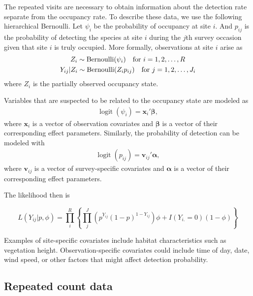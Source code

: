 \documentclass[article,shortnames]{jss}
\DeclareMathOperator{\logit}{logit}
\DeclareMathOperator{\Bern}{Bernoulli}
\begin{document}
The repeated visits are necessary to obtain information about the
detection rate separate from the occupancy rate.  To describe these
data, we use the following hierarchical Bernoulli.  Let $\psi_i$ be
the probability of occupancy at site $i$.  And $p_{ij}$ is the
probability of detecting the species at site $i$ during the $j$th
survey occasion given that site $i$ is truly occupied.  More formally,
observations at site $i$ arise as
\begin{gather}
Z_i \sim \Bern(\psi_i) \text{\quad for $i=1,2,\dots,R$} \\
Y_{ij}|Z_i \sim \Bern(Z_i p_{ij})\text{\quad for $j=1,2,\dots,J_{i}$}
\end{gather}
where $Z_i$ is the partially observed occupancy state.

Variables that are suspected to be related to the occupancy state are 
modeled as
\begin{gather}
  \logit(\psi_i) = \mathbf x_i' \mathbf \beta,
\end{gather}
where $\mathbf x_i$ is a vector of observation covariates and $\mathbf \beta$
is a vector of their corresponding effect parameters.  Similarly, the
probability of detection can be modeled with
\begin{gather}
  \logit(p_{ij}) = \mathbf v_{ij}' \mathbf \alpha,
\end{gather}
where $\mathbf v_{ij}$ is a vector of survey-specific covariates and
$\mathbf \alpha$ is a vector of their corresponding effect parameters.

The likelihood then is

\begin{equation}
L(Y_{ij}| p,\phi) = 
 \prod_{i}^{R} \left\{
    \prod_{j}^{J} 
      \left(p^{Y_{ij}}(1-p)^{1-Y_{ij}}\right)
          \phi + I(Y_{i.}=0)(1-\phi) \right\} 
\end{equation}
                                                                                                            
Examples of site-specific covariates include habitat characteristics such as vegetation height. Observation-specific covariates could include time of day, date, wind speed, or other factors that might affect detection probability. 



\subsection{Repeated count data}
\label{sec:repeated-count-data}
\end{document}
